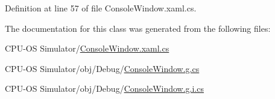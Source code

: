 Definition at line 57 of file Console\+Window.\+xaml.\+cs.



The documentation for this class was generated from the following files\+:\begin{DoxyCompactItemize}
\item 
C\+P\+U-\/\+O\+S Simulator/\hyperlink{_console_window_8xaml_8cs}{Console\+Window.\+xaml.\+cs}\item 
C\+P\+U-\/\+O\+S Simulator/obj/\+Debug/\hyperlink{_debug_2_console_window_8g_8cs}{Console\+Window.\+g.\+cs}\item 
C\+P\+U-\/\+O\+S Simulator/obj/\+Debug/\hyperlink{_debug_2_console_window_8g_8i_8cs}{Console\+Window.\+g.\+i.\+cs}\end{DoxyCompactItemize}
